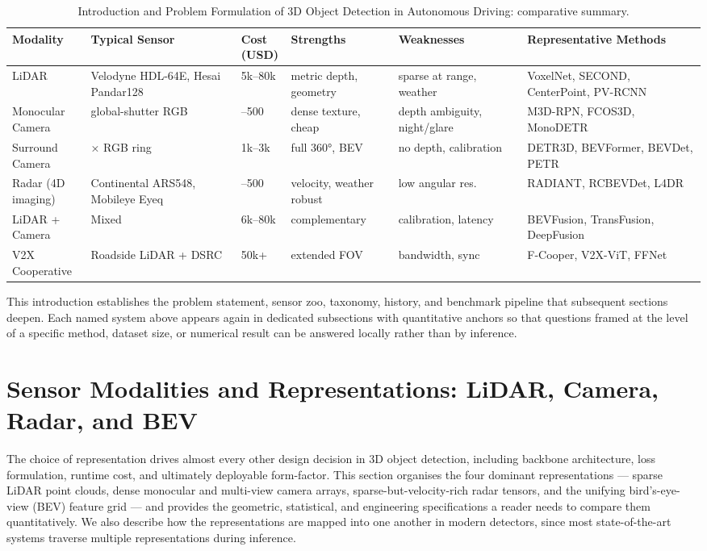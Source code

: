 \documentclass{article}
\begin{document}
\begin{table}[t]
\centering
\caption{Introduction and Problem Formulation of 3D Object Detection in Autonomous Driving: comparative summary.}
\label{tab:introduction-and-problem-formulation-of-3d-object-detection-}
\begin{tabular}{>{\raggedright\arraybackslash}p{0.1192\linewidth}
  >{\raggedright\arraybackslash}p{0.2185\linewidth}
  >{\raggedright\arraybackslash}p{0.0662\linewidth}
  >{\raggedright\arraybackslash}p{0.1589\linewidth}
  >{\raggedright\arraybackslash}p{0.1854\linewidth}
  >{\raggedright\arraybackslash}p{0.2517\linewidth}}
\toprule
Modality & Typical Sensor & Cost (USD) & Strengths & Weaknesses & Representative Methods \\
\midrule
LiDAR & Velodyne HDL-64E, Hesai Pandar128 & 5k--80k & metric depth, geometry & sparse at range, weather & VoxelNet, SECOND, CenterPoint, PV-RCNN \\
Monocular Camera & global-shutter RGB & 100--500 & dense texture, cheap & depth ambiguity, night/glare & M3D-RPN, FCOS3D, MonoDETR \\
Surround Camera & 6× RGB ring & 1k--3k & full 360°, BEV & no depth, calibration & DETR3D, BEVFormer, BEVDet, PETR \\
Radar (4D imaging) & Continental ARS548, Mobileye Eyeq & 100--500 & velocity, weather robust & low angular res. & RADIANT, RCBEVDet, L4DR \\
LiDAR + Camera & Mixed & 6k--80k & complementary & calibration, latency & BEVFusion, TransFusion, DeepFusion \\
V2X Cooperative & Roadside LiDAR + DSRC & 50k+ & extended FOV & bandwidth, sync & F-Cooper, V2X-ViT, FFNet \\
\end{tabular}
\end{table}

This introduction establishes the problem statement, sensor zoo, taxonomy, history, and benchmark pipeline that subsequent sections deepen. Each named system above appears again in dedicated subsections with quantitative anchors so that questions framed at the level of a specific method, dataset size, or numerical result can be answered locally rather than by inference.
\section{Sensor Modalities and Representations: LiDAR, Camera, Radar, and BEV}\label{sec:sensor-modalities-and-representations-lidar-camera-radar-and}
The choice of representation drives almost every other design decision in 3D object detection, including backbone architecture, loss formulation, runtime cost, and ultimately deployable form-factor. This section organises the four dominant representations --- sparse LiDAR point clouds, dense monocular and multi-view camera arrays, sparse-but-velocity-rich radar tensors, and the unifying bird's-eye-view (BEV) feature grid --- and provides the geometric, statistical, and engineering specifications a reader needs to compare them quantitatively. We also describe how the representations are mapped into one another in modern detectors, since most state-of-the-art systems traverse multiple representations during inference.
\end{document}
